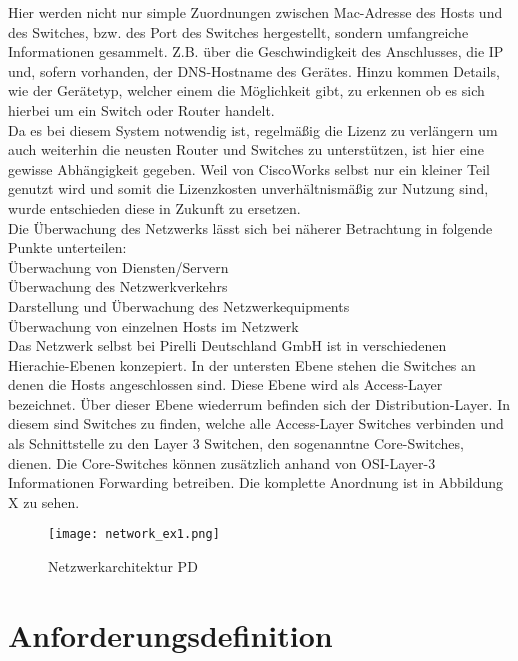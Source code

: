Hier werden nicht nur simple Zuordnungen zwischen Mac-Adresse des Hosts und des Switches, bzw. des Port des Switches hergestellt,
sondern umfangreiche Informationen gesammelt. Z.B. über die Geschwindigkeit des Anschlusses, die IP und, sofern vorhanden, der DNS-Hostname des Gerätes.
Hinzu kommen Details, wie der Gerätetyp, welcher einem die Möglichkeit gibt, zu erkennen ob es sich hierbei um ein Switch oder Router handelt.\\
Da es bei diesem System notwendig ist, regelmäßig die Lizenz zu verlängern um auch weiterhin die neusten Router und Switches zu unterstützen, ist hier eine gewisse Abhängigkeit gegeben.
Weil von CiscoWorks selbst nur ein kleiner Teil genutzt wird und somit die Lizenzkosten unverhältnismäßig zur Nutzung sind, wurde entschieden diese in Zukunft zu ersetzen.\\

Die Überwachung des Netzwerks lässt sich bei näherer Betrachtung in folgende Punkte unterteilen:\\
Überwachung von Diensten/Servern\\
Überwachung des Netzwerkverkehrs\\
Darstellung und Überwachung des Netzwerkequipments\\
Überwachung von einzelnen Hosts im Netzwerk\\

Das Netzwerk selbst bei Pirelli Deutschland GmbH ist in verschiedenen Hierachie-Ebenen konzepiert.
In der untersten Ebene stehen die Switches an denen die Hosts angeschlossen sind. Diese Ebene wird als Access-Layer bezeichnet.
Über dieser Ebene wiederrum befinden sich der Distribution-Layer. In diesem sind Switches zu finden, welche alle Access-Layer Switches verbinden und als Schnittstelle zu den Layer 3 Switchen, den sogenanntne Core-Switches, dienen.
Die Core-Switches können zusätzlich anhand von OSI-Layer-3 Informationen Forwarding betreiben.
Die komplette Anordnung ist in Abbildung X zu sehen.


\begin{figure}[H]
\centering
\texttt{[image: network\_ex1.png]}
\caption{Netzwerkarchitektur PD}
\label{fig:show_s1_s2_p1_n1}
\end{figure}

\section{Anforderungsdefinition}
\label{sec:anfdef}

